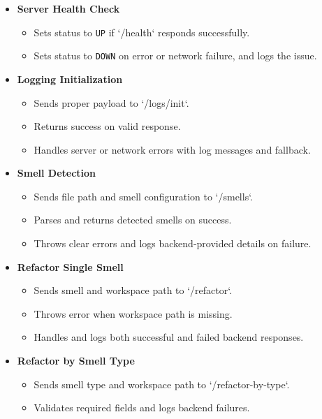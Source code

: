 \documentclass[12pt, titlepage]{article}
\begin{document}
\begin{itemize}
  \item \textbf{Server Health Check}
    \begin{itemize}
      \item Sets status to \texttt{UP} if `/health` responds successfully.
      \item Sets status to \texttt{DOWN} on error or network failure, and logs the issue.
    \end{itemize}

  \item \textbf{Logging Initialization}
    \begin{itemize}
      \item Sends proper payload to `/logs/init`.
      \item Returns success on valid response.
      \item Handles server or network errors with log messages and fallback.
    \end{itemize}

  \item \textbf{Smell Detection}
    \begin{itemize}
      \item Sends file path and smell configuration to `/smells`.
      \item Parses and returns detected smells on success.
      \item Throws clear errors and logs backend-provided details on failure.
    \end{itemize}

  \item \textbf{Refactor Single Smell}
    \begin{itemize}
      \item Sends smell and workspace path to `/refactor`.
      \item Throws error when workspace path is missing.
      \item Handles and logs both successful and failed backend responses.
    \end{itemize}

  \item \textbf{Refactor by Smell Type}
    \begin{itemize}
      \item Sends smell type and workspace path to `/refactor-by-type`.
      \item Validates required fields and logs backend failures.
    \end{itemize}
\end{itemize}
\end{document}
